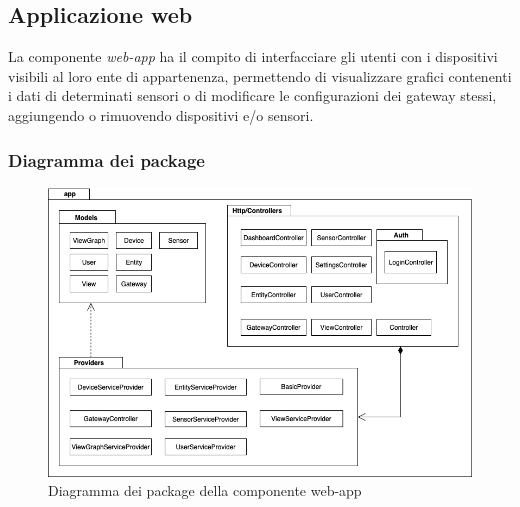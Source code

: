 \subsection{Applicazione web}
La componente \textit{web-app} ha il compito di interfacciare gli utenti con i dispositivi visibili al loro ente di appartenenza, permettendo di visualizzare grafici contenenti i dati di determinati sensori o di modificare le configurazioni dei gateway stessi, aggiungendo o rimuovendo dispositivi e/o sensori. 

	\subsubsection{Diagramma dei package}%
		\begin{figure}[H]
			\centering
			\includegraphics[scale=0.600]{res/images/WEBAPP/WebAppPackage.png}
			\caption{Diagramma dei package della componente web-app}
		\end{figure}

